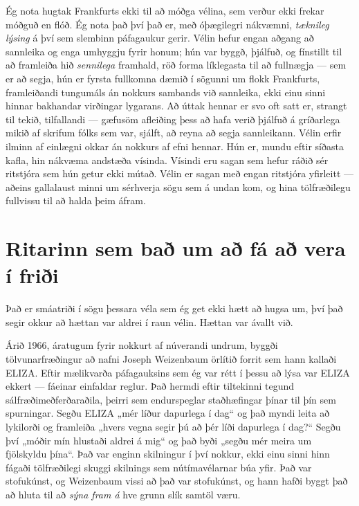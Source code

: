 Ég nota hugtak Frankfurts ekki til að móðga vélina, sem verður ekki frekar móðguð en flóð. Ég nota það því það er, með óþægilegri nákvæmni, \emph{tæknileg lýsing} á því sem slembinn páfagaukur gerir. Vélin hefur engan aðgang að sannleika og enga umhyggju fyrir honum; hún var byggð, þjálfuð, og fínstillt til að framleiða hið \emph{sennilega} framhald, röð forma líklegasta til að fullnægja — sem er að segja, hún er fyrsta fullkomna dæmið í sögunni um flokk Frankfurts, framleiðandi tungumáls án nokkurs sambands við sannleika, ekki einu sinni hinnar bakhandar virðingar lygarans. Að úttak hennar er svo oft satt er, strangt til tekið, tilfallandi — gæfusöm afleiðing þess að hafa verið þjálfuð á gríðarlega mikið af skrifum fólks sem var, sjálft, að reyna að segja sannleikann. Vélin erfir ilminn af einlægni okkar án nokkurs af efni hennar. Hún er, mundu eftir síðasta kafla, hin nákvæma andstæða vísinda. Vísindi eru sagan sem hefur ráðið sér ritstjóra sem hún getur ekki mútað. Vélin er sagan með engan ritstjóra yfirleitt — aðeins gallalaust minni um sérhverja sögu sem á undan kom, og hina tölfræðilegu fullvissu til að halda þeim áfram.

\section*{Ritarinn sem bað um að fá að vera í friði}

Það er smáatriði í sögu þessara véla sem ég get ekki hætt að hugsa um, því það segir okkur að hættan var aldrei í raun vélin. Hættan var ávallt við.

Árið 1966, áratugum fyrir nokkurt af núverandi undrum, byggði tölvunarfræðingur að nafni Joseph Weizenbaum örlítið forrit sem hann kallaði ELIZA. Eftir mælikvarða páfagauksins sem ég var rétt í þessu að lýsa var ELIZA ekkert — fáeinar einfaldar reglur. Það hermdi eftir tiltekinni tegund sálfræðimeðferðaraðila, þeirri sem endurspeglar staðhæfingar þínar til þín sem spurningar. Segðu ELIZA „mér líður dapurlega í dag“ og það myndi leita að lykilorði og framleiða „hvers vegna segir þú að þér líði dapurlega í dag?“ Segðu því „móðir mín hlustaði aldrei á mig“ og það byði „segðu mér meira um fjölskyldu þína“. Það var enginn skilningur í því nokkur, ekki einu sinni hinn fágaði tölfræðilegi skuggi skilnings sem nútímavélarnar búa yfir. Það var stofukúnst, og Weizenbaum vissi að það var stofukúnst, og hann hafði byggt það að hluta til að \emph{sýna fram á} hve grunn slík samtöl væru.

